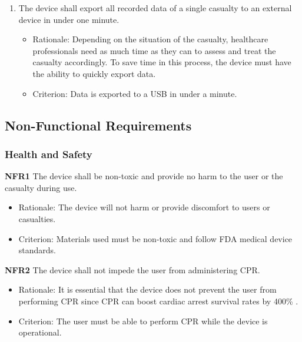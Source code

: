 \documentclass{article}
\begin{document}
\begin{enumerate}[label = \textbf{{FR8.}\arabic*}]
	    \item The device shall export all recorded data of a single casualty to an external device in under one minute.
	        \begin{itemize}
	            \item Rationale: Depending on the situation of the casualty, healthcare professionals need as much time as they can to assess and treat the casualty accordingly. To save time in this process, the device must have the ability to quickly export data.
	            \item Criterion: Data is exported to a USB in under a  minute.
	        \end{itemize}
	   \end{enumerate}

	\newpage
	
    \subsection{Non-Functional Requirements }
    
    \subsubsection{Health and Safety}
	\textbf{NFR1} The device shall be non-toxic and provide no harm to the user or the casualty during use.
	\begin{itemize}
		\item Rationale: The device will not harm or provide discomfort to users or casualties.
	    \item Criterion: Materials used must be non-toxic and follow FDA medical device standards.
	\end{itemize}
	
	\noindent
	\textbf{NFR2} The device shall not impede the user from administering CPR.
	        \begin{itemize}
	            \item Rationale: It is essential that the device does not prevent the user from performing CPR since CPR can boost cardiac arrest survival rates by 400\% \citep{cpr_survival}.
	            \item Criterion: The user must be able to perform CPR while the device is operational. 
	        \end{itemize}
     
\end{document}
